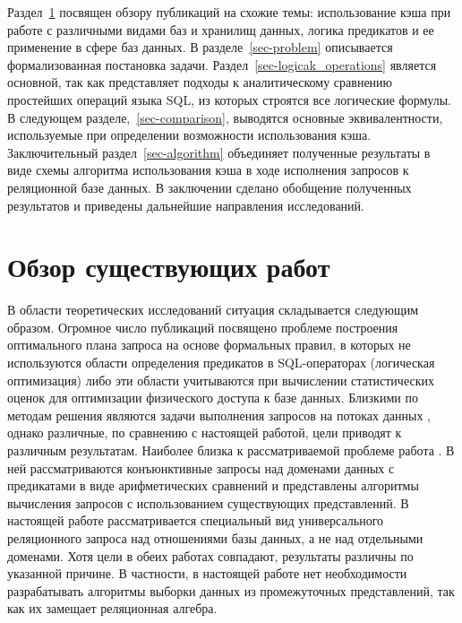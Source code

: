 \documentclass{cmi}
\begin{document}
Раздел~\ref{sec-overview} посвящен обзору публикаций на схожие темы: использование кэша при работе с различными видами баз и хранилищ данных, логика предикатов и ее применение в сфере баз данных. В разделе~\ref{sec-problem} описывается формализованная постановка задачи. Раздел~\ref{sec-logicak_operations} является основной, так как представляет подходы к аналитическому сравнению простейших операций языка SQL, из которых строятся все логические формулы. В следующем разделе,~\ref{sec-comparison}, выводятся основные эквивалентности, используемые при определении возможности использования кэша. Заключительный раздел~\ref{sec-algorithm} объединяет полученные результаты в виде схемы алгоритма использования кэша в ходе исполнения запросов к реляционной базе данных. В заключении сделано обобщение полученных результатов и приведены дальнейшие направления исследований.

\section{Обзор существующих работ}
\label{sec-overview}
В области теоретических исследований ситуация складывается следующим образом. Огромное число публикаций посвящено проблеме построения оптимального плана запроса на основе формальных правил, в которых не используются области определения предикатов в SQL-операторах (логическая оптимизация) либо эти области учитываются при вычислении статистических оценок для оптимизации физического доступа к базе данных. Близкими по методам решения являются задачи выполнения запросов на потоках данных \cite{olston, denny}, однако различные, по сравнению с настоящей работой, цели приводят к различным результатам. Наиболее близка к рассматриваемой проблеме работа \cite{afrati}. В ней рассматриваются конъюнктивные запросы над доменами данных с предикатами в виде арифметических сравнений и представлены алгоритмы вычисления запросов с использованием существующих представлений. В настоящей работе рассматривается специальный вид универсального реляционного запроса над отношениями базы данных, а не над отдельными доменами. Хотя цели в обеих работах совпадают, результаты различны по указанной причине. В частности, в настоящей работе нет необходимости разрабатывать алгоритмы выборки данных из промежуточных представлений, так как их замещает реляционная алгебра.
\end{document}

